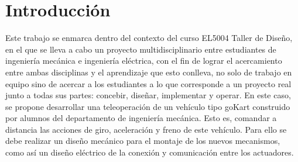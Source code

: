 \section{Introducción}

Este trabajo se enmarca dentro del contexto del curso EL5004 Taller de Diseño, en el que se lleva a cabo un proyecto multidisciplinario entre estudiantes de ingeniería mecánica e ingeniería eléctrica, con el fin de lograr el acercamiento entre ambas disciplinas y el aprendizaje que esto conlleva, no solo de trabajo en equipo sino de acercar a los estudiantes a lo que corresponde a un proyecto real junto a todas sus partes: concebir, diseñar, implementar y operar.
En este caso, se propone desarrollar una teleoperación de un vehículo tipo goKart construido por alumnos del departamento de ingeniería mecánica. Esto es, comandar a distancia las acciones de giro, aceleración y freno de este vehículo. Para ello se debe realizar un diseño mecánico para el montaje de los nuevos mecanismos, como así un diseño eléctrico de la conexión y comunicación entre los actuadores. 
